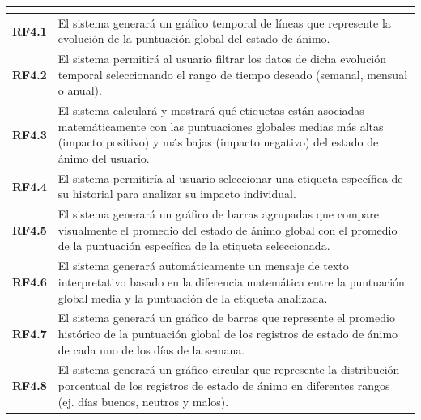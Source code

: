 \begin{xltabular}{\textwidth}{|>{\bfseries}c|X|}
     \\ \hline
    RF4.1 & El sistema generará un gráfico temporal de líneas que represente la evolución de la puntuación global del estado de ánimo. \\ \hline
    RF4.2 & El sistema permitirá al usuario filtrar los datos de dicha evolución temporal seleccionando el rango de tiempo deseado (semanal, mensual o anual). \\ \hline
    RF4.3 & El sistema calculará y mostrará qué etiquetas están asociadas matemáticamente con las puntuaciones globales medias más altas (impacto positivo) y más bajas (impacto negativo) del estado de ánimo del usuario. \\ \hline
    RF4.4 & El sistema permitiría al usuario seleccionar una etiqueta específica de su historial para analizar su impacto individual. \\ \hline
    RF4.5 & El sistema generará un gráfico de barras agrupadas que compare visualmente el promedio del estado de ánimo global con el promedio de la puntuación específica de la etiqueta seleccionada. \\ \hline
    RF4.6 & El sistema generará automáticamente un mensaje de texto interpretativo basado en la diferencia matemática entre la puntuación global media y la puntuación de la etiqueta analizada. \\ \hline
    RF4.7 & El sistema generará un gráfico de barras que represente el promedio histórico de la puntuación global de los registros de estado de ánimo de cada uno de los días de la semana. \\ \hline
    RF4.8 & El sistema generará un gráfico circular que represente la distribución porcentual de los registros de estado de ánimo en diferentes rangos (ej. días buenos, neutros y malos). \\ \hline


\end{xltabular}

